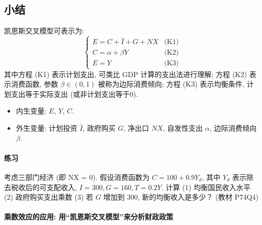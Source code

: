 \subsection*{小结} 

凯恩斯交叉模型可表示为:
\begin{equation*}
\, \begin{cases}
E = C + \bar{I} + G + NX  &\text{(K1)} \\
C = \alpha + \beta Y &\text{(K2)}  \\
E =Y  &\text{(K3)}
\end{cases}  
\end{equation*}
其中方程 (K1) 表示计划支出, 可类比 GDP 计算的支出法进行理解;
方程 (K2) 表示消费函数, 参数 $\beta \in (0,1)$ 被称为边际消费倾向;
方程 (K3) 表示均衡条件, 计划支出等于实际支出 (或非计划支出等于0).

\begin{itemize}
\item 
  内生变量: $E$, $Y$, $C$.
\item 
  外生变量: 计划投资 $\bar{I}$, 政府购买 $G$, 净出口 $NX$, 自发性支出 $\alpha$, 边际消费倾向 $\beta$.  
\end{itemize}

\begin{framed}
\paragraph{练习} 考虑三部门经济  (即 NX = 0).
假设消费函数为 $C = 100 + 0.9 Y_d$, 其中 $Y_d$ 表示除去税收后的可支配收入, $I=300,  G=160,  T=0.2Y$. 计算  (1) 均衡国民收入水平  (2) 政府购买支出乘数  (3) 若 $G$ 增加到 300, 新的均衡收入是多少？  \hfill  (教材 P74Q4)
\end{framed}



\clearpage

\paragraph{乘数效应的应用: 用``凯恩斯交叉模型''来分析财政政策}

